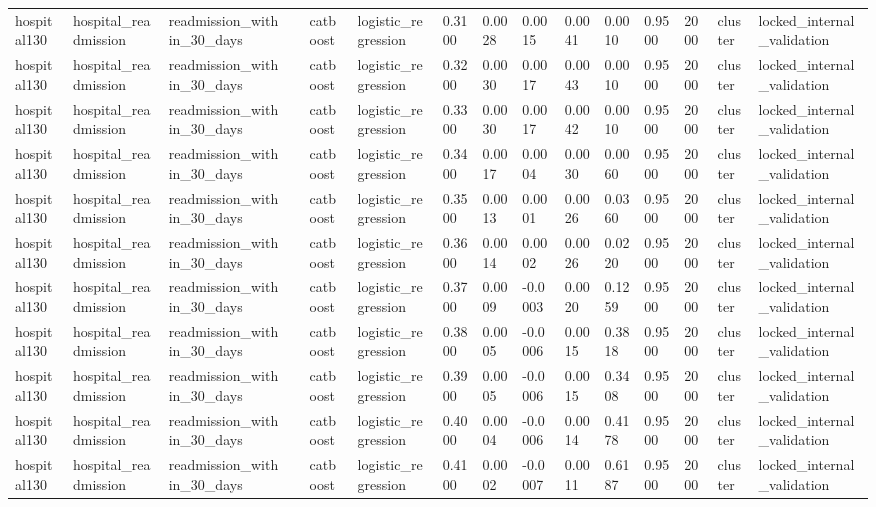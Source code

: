 \begin{tabular}{lllllllllllllll}
hospital130 & hospital\_readmission & readmission\_within\_30\_days &  & catboost & logistic\_regression & 0.3100 & 0.0028 & 0.0015 & 0.0041 & 0.0010 & 0.9500 & 2000 & cluster & locked\_internal\_validation \\
hospital130 & hospital\_readmission & readmission\_within\_30\_days &  & catboost & logistic\_regression & 0.3200 & 0.0030 & 0.0017 & 0.0043 & 0.0010 & 0.9500 & 2000 & cluster & locked\_internal\_validation \\
hospital130 & hospital\_readmission & readmission\_within\_30\_days &  & catboost & logistic\_regression & 0.3300 & 0.0030 & 0.0017 & 0.0042 & 0.0010 & 0.9500 & 2000 & cluster & locked\_internal\_validation \\
hospital130 & hospital\_readmission & readmission\_within\_30\_days &  & catboost & logistic\_regression & 0.3400 & 0.0017 & 0.0004 & 0.0030 & 0.0060 & 0.9500 & 2000 & cluster & locked\_internal\_validation \\
hospital130 & hospital\_readmission & readmission\_within\_30\_days &  & catboost & logistic\_regression & 0.3500 & 0.0013 & 0.0001 & 0.0026 & 0.0360 & 0.9500 & 2000 & cluster & locked\_internal\_validation \\
hospital130 & hospital\_readmission & readmission\_within\_30\_days &  & catboost & logistic\_regression & 0.3600 & 0.0014 & 0.0002 & 0.0026 & 0.0220 & 0.9500 & 2000 & cluster & locked\_internal\_validation \\
hospital130 & hospital\_readmission & readmission\_within\_30\_days &  & catboost & logistic\_regression & 0.3700 & 0.0009 & -0.0003 & 0.0020 & 0.1259 & 0.9500 & 2000 & cluster & locked\_internal\_validation \\
hospital130 & hospital\_readmission & readmission\_within\_30\_days &  & catboost & logistic\_regression & 0.3800 & 0.0005 & -0.0006 & 0.0015 & 0.3818 & 0.9500 & 2000 & cluster & locked\_internal\_validation \\
hospital130 & hospital\_readmission & readmission\_within\_30\_days &  & catboost & logistic\_regression & 0.3900 & 0.0005 & -0.0006 & 0.0015 & 0.3408 & 0.9500 & 2000 & cluster & locked\_internal\_validation \\
hospital130 & hospital\_readmission & readmission\_within\_30\_days &  & catboost & logistic\_regression & 0.4000 & 0.0004 & -0.0006 & 0.0014 & 0.4178 & 0.9500 & 2000 & cluster & locked\_internal\_validation \\
hospital130 & hospital\_readmission & readmission\_within\_30\_days &  & catboost & logistic\_regression & 0.4100 & 0.0002 & -0.0007 & 0.0011 & 0.6187 & 0.9500 & 2000 & cluster & locked\_internal\_validation \\

\end{tabular}
